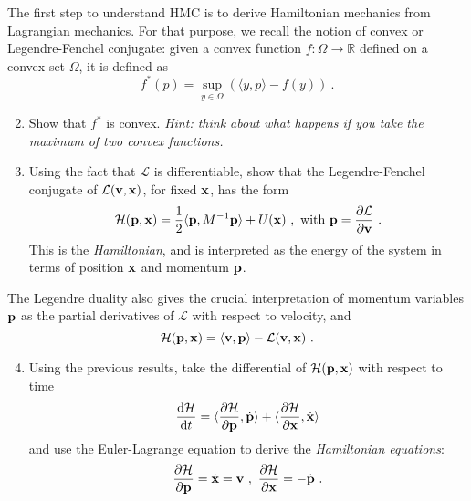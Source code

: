 \documentclass{article}
\newcommand{\R}{\mathbb{R}}
\newcommand{\xx}{{\bf x}}
\newcommand{\pp}{{\bf p}}
\newcommand{\vv}{{\bf v}}
\begin{document}
The first step to understand HMC is to derive Hamiltonian mechanics from Lagrangian mechanics. For that purpose, we recall the notion of convex or Legendre-Fenchel conjugate: given a convex function $f: \Omega \to \R$ defined on a convex set $\Omega$, it is defined as 
\begin{equation}
f^*(p) = \sup_{y \in \Omega} \left( \langle y, p \rangle - f(y) \right)~.
\end{equation}
\begin{enumerate}
\setcounter{enumi}{1}
\item Show that $f^*$ is convex. {\it Hint: think about what happens if you take the maximum of two convex functions.}
\item Using the fact that $\mathcal{L}$ is differentiable, show that the Legendre-Fenchel conjugate of $\mathcal{L}(\vv, \xx)$, for fixed $\xx$, has the form 
\begin{equation}
\label{hami}
\mathcal{H}(\pp, \xx) = \frac{1}{2} \langle \pp, M^{-1} \pp \rangle + U(\xx)~,\text{ with } \pp = \frac{\partial \mathcal{L}}{\partial \vv}~.
\end{equation}
This is the \emph{Hamiltonian}, and is interpreted as the energy of the system in terms of position $\xx$ and momentum $\pp$.
\end{enumerate}
The Legendre duality also gives the crucial interpretation 
of momentum variables $\pp$ as the partial derivatives of $\mathcal{L}$ with respect to velocity, and
\begin{equation}
\mathcal{H}(\pp, \xx) = \langle \vv, \pp \rangle - \mathcal{L}(\vv,\xx)~.
\end{equation}
\begin{enumerate}
\setcounter{enumi}{3}
\item Using the previous results, take the differential of $\mathcal{H}(\pp,\xx)$ with respect to time
$$\frac{\mathrm{d} \mathcal{H}}{\mathrm{d}t} = \langle \frac{\partial \mathcal{H}}{\partial \pp}, \dot{\pp} \rangle + \langle \frac{\partial \mathcal{H}}{\partial \xx} ,\dot{\xx} \rangle $$
and use the Euler-Lagrange equation to derive the \emph{Hamiltonian equations}:
\begin{equation}
\frac{\partial \mathcal{H}}{\partial \pp} = \dot{\xx}=\vv ~,~ \frac{\partial \mathcal{H}}{\partial \xx} = -\dot{\pp}~. 
\end{equation}
\end{enumerate}
\end{document}
